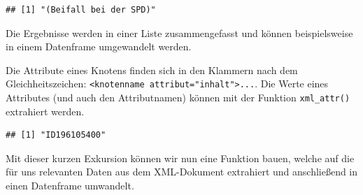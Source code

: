 \documentclass[oneside, 12pt, numbers=endperiod]{scrbook}
\newenvironment{Shaded}{\begin{snugshade}}{\end{snugshade}}
\newcommand{\KeywordTok}[1]{\textcolor[rgb]{0.13,0.29,0.53}{\textbf{#1}}}
\newcommand{\NormalTok}[1]{#1}
\newcommand{\OperatorTok}[1]{\textcolor[rgb]{0.81,0.36,0.00}{\textbf{#1}}}
\newcommand{\StringTok}[1]{\textcolor[rgb]{0.31,0.60,0.02}{#1}}
\theoremstyle{definition}
\theoremstyle{definition}
\theoremstyle{definition}
\theoremstyle{remark}
\begin{document}
\begin{Shaded}
\end{Shaded}

\begin{verbatim}
## [1] "(Beifall bei der SPD)"
\end{verbatim}

Die Ergebnisse werden in einer Liste zusammengefasst und können
beispielsweise in einem Datenframe umgewandelt werden.

Die Attribute eines Knotens finden sich in den Klammern nach dem
Gleichheitszeichen:
\texttt{\textless{}knotenname\ attribut="inhalt"\textgreater{}...}. Die
Werte eines Attributes (und auch den Attributnamen) können mit der
Funktion \texttt{xml\_attr()} extrahiert werden.

\begin{Shaded}
\end{Shaded}

\begin{verbatim}
## [1] "ID196105400"
\end{verbatim}

Mit dieser kurzen Exkursion können wir nun eine Funktion bauen, welche
auf die für uns relevanten Daten aus dem XML-Dokument extrahiert und
anschließend in einen Datenframe umwandelt.
\end{document}
